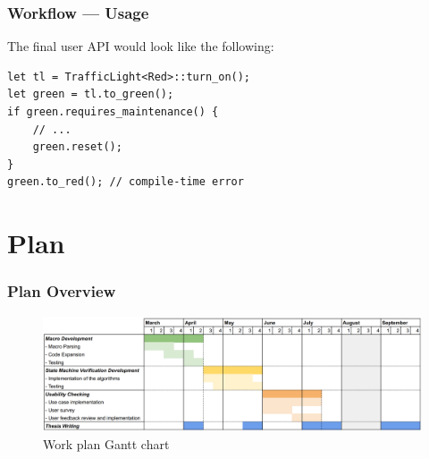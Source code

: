 \documentclass[bigger,notes,aspectratio=169]{beamer}
\begin{document}
\begin{frame}[fragile]
    \frametitle{Workflow --- Usage}
    The final user API would look like the following:
    \begin{listing}
        \centering
        \begin{verbatim}
let tl = TrafficLight<Red>::turn_on();
let green = tl.to_green();
if green.requires_maintenance() {
    // ...
    green.reset();
}
green.to_red(); // compile-time error
        \end{verbatim}
    \end{listing}

\end{frame}

\section{Plan}

\begin{frame}
    \frametitle{Plan Overview}

    \begin{figure}[h]
        \centering
        \includegraphics[width=\linewidth]{planning.png}
        \caption{Work plan Gantt chart}
    \end{figure}

\end{frame}
\end{document}
